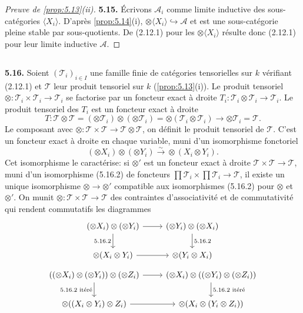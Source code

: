 \documentclass[12pt,a4paper]{article}
\theoremstyle{plain}
\theoremstyle{definition}
\theoremstyle{remark}
\begin{document}
\begin{proof}[Preuve de \ref{prop:5.13}(ii)]
\textbf{5.15.} Écrivons $\mathcal{A}_i$ comme limite inductive des sous-catégories $\langle X_i \rangle$. D'après \ref{prop:5.14}(i), $\otimes \langle X_i \rangle \hookrightarrow \mathcal{A}$ et est une sous-catégorie pleine stable par sous-quotients. De (2.12.1) pour les $\otimes \langle X_i \rangle$ résulte donc (2.12.1) pour leur limite inductive $\mathcal{A}$.
\end{proof}

\subsection{}

\textbf{5.16.} Soient $(\mathcal{T}_i)_{i \in I}$ une famille finie de catégories tensorielles sur $k$ vérifiant (2.12.1) et $\mathcal{T}$ leur produit tensoriel sur $k$ (\ref{prop:5.13}(i)). Le produit tensoriel $\otimes : \mathcal{T}_i \times \mathcal{T}_i \to \mathcal{T}_i$ se factorise par un foncteur exact à droite $T_i : \mathcal{T}_i \otimes \mathcal{T}_i \to \mathcal{T}_i$. Le produit tensoriel des $T_i$ est un foncteur exact à droite
\begin{equation}\label{eq:5.16.1}
T : \mathcal{T} \otimes \mathcal{T} = (\otimes \mathcal{T}_i) \otimes (\otimes \mathcal{T}_i) = \otimes (\mathcal{T}_i \otimes \mathcal{T}_i) \to \otimes \mathcal{T}_i = \mathcal{T}.
\end{equation}
Le composant avec $\otimes : \mathcal{T} \times \mathcal{T} \to \mathcal{T} \otimes \mathcal{T}$, on définit le produit tensoriel de $\mathcal{T}$. C'est un foncteur exact à droite en chaque variable, muni d'un isomorphisme fonctoriel
\begin{equation}\label{eq:5.16.2}
(\otimes X_i) \otimes (\otimes Y_i) \xrightarrow{\sim} \otimes (X_i \otimes Y_i).
\end{equation}
Cet isomorphisme le caractérise: si $\otimes'$ est un foncteur exact à droite $\mathcal{T} \times \mathcal{T} \to \mathcal{T}$, muni d'un isomorphisme (5.16.2) de foncteurs $\prod \mathcal{T}_i \times \prod \mathcal{T}_i \to \mathcal{T}$, il existe un unique isomorphisme $\otimes \to \otimes'$ compatible aux isomorphismes (5.16.2) pour $\otimes$ et $\otimes'$. On munit $\otimes : \mathcal{T} \times \mathcal{T} \to \mathcal{T}$ des contraintes d'associativité et de commutativité qui rendent commutatifs les diagrammes
\[
\begin{tikzcd}
(\otimes X_i) \otimes (\otimes Y_i) \arrow[r] \arrow[d, "5.16.2"'] & (\otimes Y_i) \otimes (\otimes X_i) \arrow[d, "5.16.2"] \\
\otimes (X_i \otimes Y_i) \arrow[r] & \otimes (Y_i \otimes X_i)
\end{tikzcd}
\]
\[
\begin{tikzcd}
((\otimes X_i) \otimes (\otimes Y_i)) \otimes (\otimes Z_i) \arrow[r] \arrow[d, "5.16.2 \text{ itéré}"'] & (\otimes X_i) \otimes ((\otimes Y_i) \otimes (\otimes Z_i)) \arrow[d, "5.16.2 \text{ itéré}"] \\
\otimes ((X_i \otimes Y_i) \otimes Z_i) \arrow[r] & \otimes (X_i \otimes (Y_i \otimes Z_i))
\end{tikzcd}
\]
\end{document}
